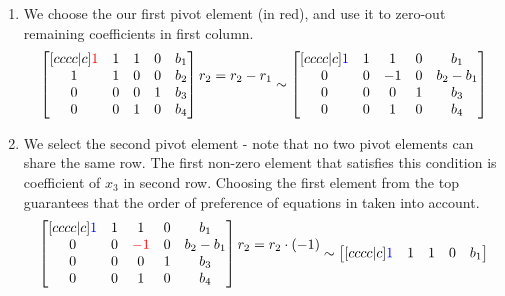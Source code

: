\begin{enumerate}
\item We choose the our first pivot element (in red), and use it to zero-out remaining coefficients in first column.
\begin{equation}
\begin{bmatrix}[cccc|c]
    \textcolor{red}{1} & 1 & 1 & 0 & b_1 \\ 
    1 & 1 & 0 & 0 & b_2 \\ 
    0 & 0 & 0 & 1 & b_3 \\ 
    0 & 0 & 1 & 0 & b_4
\end{bmatrix}
\begin{matrix} \\ r_2 = r_2 - r_1 \\ \\ \\ \end{matrix} \sim
\begin{bmatrix}[cccc|c]
    \textcolor{blue}{1} & 1 & 1 & 0 & b_1 \\ 
    0 & 0 & -1 & 0 & b_2 - b_1 \\ 
    0 & 0 & 0 & 1 & b_3 \\ 
    0 & 0 & 1 & 0 & b_4
\end{bmatrix}
\end{equation}
\item We select the second pivot element - note that no two pivot elements can share the same row.
The first non-zero element that satisfies this condition is coefficient of $x_3$ in second row.
Choosing the first element from the top guarantees that the order of preference of equations in taken into account.
\begin{equation}
\begin{bmatrix}[cccc|c]
    \textcolor{blue}{1} & 1 & 1 & 0 & b_1 \\ 
    0 & 0 & \textcolor{red}{-1} & 0 & b_2 - b_1 \\ 
    0 & 0 & 0 & 1 & b_3 \\ 
    0 & 0 & 1 & 0 & b_4
\end{bmatrix}
\begin{matrix} \\ r_2 = r_2 \cdot (-1) \\ \\ \\ \end{matrix} \sim
\begin{bmatrix}[cccc|c]
    \textcolor{blue}{1} & 1 & 1 & 0 & b_1 \\ 

\end{bmatrix}
\end{equation}
\end{enumerate}
